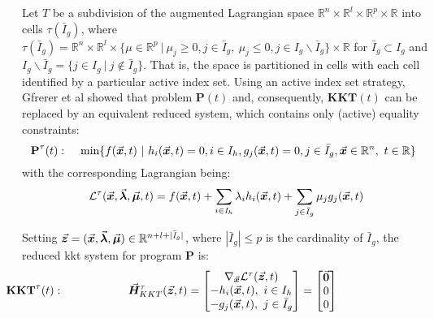 Let $T$ be a subdivision of the augmented Lagrangian space
$\mathbb{R}^n\times\mathbb{R}^l\times\mathbb{R}^p\times\mathbb{R}$ into cells
$\tau(\bar{\mathit{I}}_g)$, where $\tau(\bar{\mathit{I}}_g) =
\mathbb{R}^n\times\mathbb{R}^l\times\{\mu\in\mathbb{R}^p\ |\ \mu_j\geq
0,j\in\bar{\mathit{I}}_g,\ \mu_j\leq 0,
j\in\mathit{I}_g\backslash\bar{\mathit{I}}_g\}\times\mathbb{R}$ for
$\bar{\mathit{I}}_g\subset\mathit{I}_g$ and $I_g\backslash\bar{I}_g = \{j\in 
I_g\ |\ j\notin \bar{I}_g\}$. That is, the space is partitioned in cells with 
each cell identified by a particular active index set. Using an active index 
set strategy, Gfrerer et al\cite{Gfrerer:1985} showed that problem
$\textbf{P}(t)$ and, consequently, $\textbf{KKT}(t)$ can be 
replaced by an equivalent reduced system, which contains only (active) equality 
constraints\cite{Guddat:1990,Gfrerer:1985}:
\begin{equation}
	\hspace*{-0.2cm}\textbf{P}^{\tau}(t): 
	\hspace*{0.4cm}\text{min}\{f(\bvec{x},t)\ |\
	h_i(\bvec{x},t)=0,i\in I_h, g_j(\bvec{x},t)=0, 
	j\in\bar{I}_g,\bvec{x}\in\mathbb{R}^n,\ t\in\mathbb{R}\}
\end{equation}
with the corresponding Lagrangian being:
\begin{equation}
	\mathcal{L}^{\tau}(\vec{\boldsymbol{x}},\vec{\boldsymbol{\lambda}},\vec{\boldsymbol{\mu}},t) =
	f(\vec{\boldsymbol{x}},t)+\sum_{i\in\mathit{I}_h}\lambda_ih_i(\vec{\boldsymbol{x}},t)+\sum_{j\in
		\bar{I}_g}\mu_jg_j(\vec{\boldsymbol{x}},t)
	\label{eq:LagrangianREDUCED}
\end{equation}

Setting
$\vec{\boldsymbol{z}}=(\vec{\boldsymbol{x}},\vec{\boldsymbol{\lambda}},\vec{\boldsymbol{\mu}})\in\mathbb{R}^{n+l+|\bar{\mathit{I}}_g|}$,
where $|\bar{\mathit{I}}_g|\leq p$ is the cardinality of $\bar{\mathit{I}}_g$, 
the reduced \acrshort{kkt} system for program \textbf{P} is:
\begin{equation}
	\hspace{-3.4cm}\textbf{KKT}^{\tau}(t):\hspace{2.0cm}\bvec{H}_{KKT}^{\tau}(\bvec{z},t)=\begin{bmatrix}
		\nabla_{\bvec{x}}\mathcal{L}^{\tau}(\bvec{z},t)\\
		-h_i(\bvec{x},t),\ i\in I_h\\ 
		-g_j(\bvec{x},t),\ j\in \bar{I}_g
	\end{bmatrix}=\begin{bmatrix}
		\bvec{0}\\0\\ 0
	\end{bmatrix}
	\label{eq:KKTER}
\end{equation}

